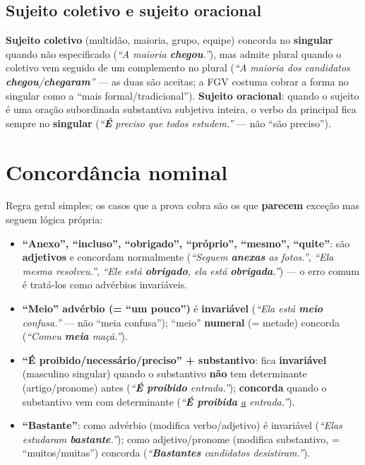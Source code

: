 \subsection{Sujeito coletivo e sujeito oracional}

\begin{conceito}
\textbf{Sujeito coletivo} (multidão, maioria, grupo, equipe) concorda no
\textbf{singular} quando não especificado (\textit{“A maioria
\textbf{chegou}.”}), mas admite plural quando o coletivo vem seguido de um
complemento no plural (\textit{“A maioria dos candidatos
\textbf{chegou}/\textbf{chegaram}”} --- as duas são aceitas; a FGV costuma
cobrar a forma no singular como a “mais formal/tradicional”).
\textbf{Sujeito oracional}: quando o sujeito é uma oração subordinada
substantiva subjetiva inteira, o verbo da principal fica sempre no
\textbf{singular} (\textit{“\textbf{É} preciso que todos estudem.”} --- não
“são preciso”).
\end{conceito}

\section{Concordância nominal}

\begin{conceito}
Regra geral simples; os casos que a prova cobra são os que \textbf{parecem}
exceção mas seguem lógica própria:

\begin{itemize}
\item \textbf{“Anexo”, “incluso”, “obrigado”, “próprio”, “mesmo”, “quite”}:
são \textbf{adjetivos} e concordam normalmente (\textit{“Seguem
\textbf{anexas} as fotos.”}, \textit{“Ela mesma resolveu.”}, \textit{“Ele
está \textbf{obrigado}, ela está \textbf{obrigada}.”}) --- o erro comum é
tratá-los como advérbios invariáveis.
\item \textbf{“Meio” advérbio (= “um pouco”)} é \textbf{invariável}
(\textit{“Ela está \textbf{meio} confusa.”} --- não “meia confusa”); “meio”
\textbf{numeral} (= metade) concorda (\textit{“Comeu \textbf{meia}
maçã.”}).
\item \textbf{“É proibido/necessário/preciso” + substantivo}: fica
\textbf{invariável} (masculino singular) quando o substantivo \textbf{não}
tem determinante (artigo/pronome) antes (\textit{“\textbf{É proibido}
entrada.”}); \textbf{concorda} quando o substantivo vem com determinante
(\textit{“\textbf{É proibida} \underline{a} entrada.”}).
\item \textbf{“Bastante”}: como advérbio (modifica verbo/adjetivo) é
invariável (\textit{“Elas estudaram \textbf{bastante}.”}); como
adjetivo/pronome (modifica substantivo, = “muitos/muitas”) concorda
(\textit{“\textbf{Bastantes} candidatos desistiram.”}).
\end{itemize}
\end{conceito}

